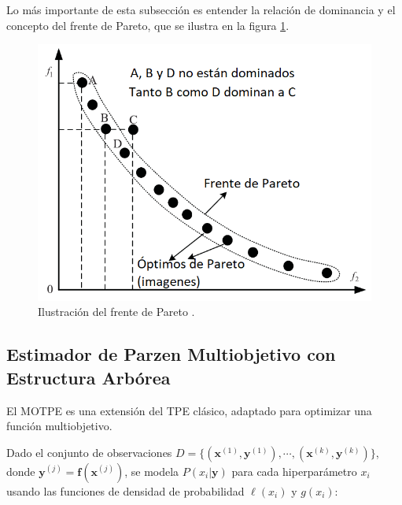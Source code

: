


Lo más importante de esta subsección es entender la relación de dominancia y el concepto del frente de Pareto, que se ilustra en la figura \ref{fig:pareto-fig}.

\begin{figure}[h!]
\centering
\includegraphics[width=.7\columnwidth]{figs//pareto-illustration.png}
\caption{Ilustración del frente de Pareto \cite{qing2014}.}
\label{fig:pareto-fig}
\end{figure}



\subsection{Estimador de Parzen Multiobjetivo con Estructura Arbórea}

El MOTPE es una extensión del TPE clásico, adaptado para optimizar una función multiobjetivo.

Dado el conjunto de observaciones $D = \{(\textbf{x}^{(1)},\textbf{y}^{(1)}), \cdots, (\textbf{x}^{(k)},\textbf{y}^{(k)}) \}$, donde $\textbf{y}^{(j)} = \textbf{f}(\textbf{x}^{(j)})$, se modela $P(x_i|\textbf{y})$ para cada hiperparámetro $x_i$ usando las funciones de densidad de probabilidad $\ell(x_i)$ y $g(x_i)$:


